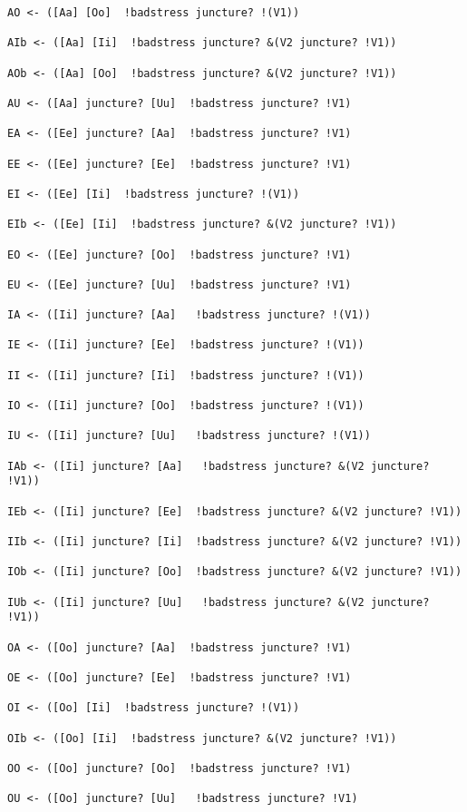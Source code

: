 \documentclass{article}
\begin{document}
\begin{verbatim}
AO <- ([Aa] [Oo]  !badstress juncture? !(V1)) 

AIb <- ([Aa] [Ii]  !badstress juncture? &(V2 juncture? !V1))  

AOb <- ([Aa] [Oo]  !badstress juncture? &(V2 juncture? !V1))  
 
AU <- ([Aa] juncture? [Uu]  !badstress juncture? !V1)  

EA <- ([Ee] juncture? [Aa]  !badstress juncture? !V1)  

EE <- ([Ee] juncture? [Ee]  !badstress juncture? !V1)  

EI <- ([Ee] [Ii]  !badstress juncture? !(V1)) 

EIb <- ([Ee] [Ii]  !badstress juncture? &(V2 juncture? !V1))  

EO <- ([Ee] juncture? [Oo]  !badstress juncture? !V1)  

EU <- ([Ee] juncture? [Uu]  !badstress juncture? !V1)  

IA <- ([Ii] juncture? [Aa]   !badstress juncture? !(V1))  

IE <- ([Ii] juncture? [Ee]  !badstress juncture? !(V1))  

II <- ([Ii] juncture? [Ii]  !badstress juncture? !(V1))  

IO <- ([Ii] juncture? [Oo]  !badstress juncture? !(V1))  

IU <- ([Ii] juncture? [Uu]   !badstress juncture? !(V1)) 

IAb <- ([Ii] juncture? [Aa]   !badstress juncture? &(V2 juncture? !V1))  

IEb <- ([Ii] juncture? [Ee]  !badstress juncture? &(V2 juncture? !V1))  

IIb <- ([Ii] juncture? [Ii]  !badstress juncture? &(V2 juncture? !V1))  

IOb <- ([Ii] juncture? [Oo]  !badstress juncture? &(V2 juncture? !V1))  

IUb <- ([Ii] juncture? [Uu]   !badstress juncture? &(V2 juncture? !V1))   

OA <- ([Oo] juncture? [Aa]  !badstress juncture? !V1)  

OE <- ([Oo] juncture? [Ee]  !badstress juncture? !V1)  

OI <- ([Oo] [Ii]  !badstress juncture? !(V1)) 

OIb <- ([Oo] [Ii]  !badstress juncture? &(V2 juncture? !V1)) 

OO <- ([Oo] juncture? [Oo]  !badstress juncture? !V1)  

OU <- ([Oo] juncture? [Uu]   !badstress juncture? !V1)  


\end{verbatim}
\end{document}
